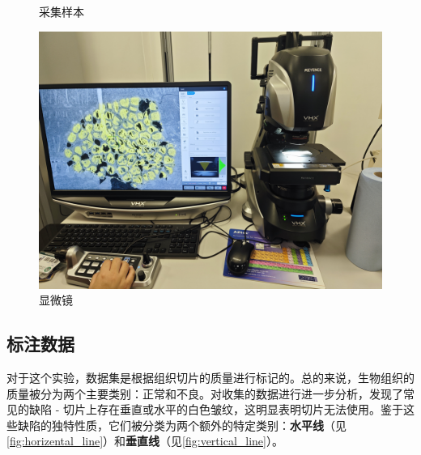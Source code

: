 \begin{figure}[htbp]
\begin{minipage}{0.3\textwidth}
        \caption{采集样本}
        \label{fig:采集样本}
    \end{minipage}
    \begin{minipage}{0.35\textwidth}
        \centering
        \includegraphics[width=\textwidth]{./fig/显微镜.jpg}
        \caption{显微镜}
        \label{fig:显微镜}
    \end{minipage}
\end{figure}






\subsection{标注数据}

对于这个实验，数据集是根据组织切片的质量进行标记的。总的来说，生物组织的质量被分为两个主要类别：正常和不良。对收集的数据进行进一步分析，发现了常见的缺陷 - 切片上存在垂直或水平的白色皱纹，这明显表明切片无法使用。鉴于这些缺陷的独特性质，它们被分类为两个额外的特定类别：\textbf{水平线}（见\autoref{fig:horizental_line}）和\textbf{垂直线}（见\autoref{fig:vertical_line}）。

